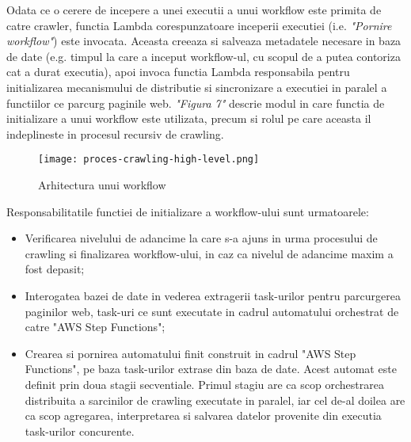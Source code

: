 Odata ce o cerere de incepere a unei executii a unui workflow este primita de catre crawler, functia Lambda corespunzatoare inceperii executiei (i.e. \textit{"Pornire workflow"}) este invocata. Aceasta creeaza si salveaza metadatele necesare in baza de date (e.g. timpul la care a inceput workflow-ul, cu scopul de a putea contoriza cat a durat executia), apoi invoca functia Lambda responsabila pentru initializarea mecanismului de distributie si sincronizare a executiei in paralel a functiilor ce parcurg paginile web. \textit{"Figura 7"} descrie modul in care functia de initializare a unui workflow este utilizata, precum si rolul pe care aceasta il indeplineste in procesul recursiv de crawling.

\begin{figure}[ht]
\begin{center}
	\texttt{[image: proces-crawling-high-level.png]}
	\caption{Arhitectura unui workflow \cite{diagram-icons-sources, aws-icons-source}}\par\medskip 

\end{center}
\end{figure}

\noindent
Responsabilitatile functiei de initializare a workflow-ului sunt urmatoarele:

\begin{itemize}
	\item{Verificarea nivelului de adancime la care s-a ajuns in urma procesului de crawling si finalizarea workflow-ului, in caz ca nivelul de adancime maxim a fost depasit;}
	\item{Interogatea bazei de date in vederea extragerii task-urilor pentru parcurgerea paginilor web, task-uri ce sunt executate in cadrul automatului orchestrat de catre "AWS Step Functions";}
	\item{Crearea si pornirea automatului finit construit in cadrul "AWS Step Functions", pe baza task-urilor extrase din baza de date. Acest automat este definit prin doua stagii secventiale. Primul stagiu are ca scop orchestrarea distribuita a sarcinilor de crawling executate in paralel, iar cel de-al doilea are ca scop agregarea, interpretarea si salvarea datelor provenite din executia task-urilor concurente.}
\end{itemize}
